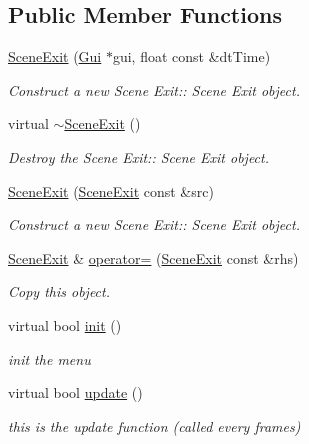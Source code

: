\subsection*{Public Member Functions}
\begin{DoxyCompactItemize}
\item 
\hyperlink{class_scene_exit_ac7fd49d030cc70f80bcedd66017f461f}{Scene\+Exit} (\hyperlink{class_gui}{Gui} $\ast$gui, float const \&dt\+Time)
\begin{DoxyCompactList}\small\item\em Construct a new Scene Exit\+:\+: Scene Exit object. \end{DoxyCompactList}\item 
\mbox{\label{class_scene_exit_aa27eccb4dabd1b578c260dd92873e437}} 
virtual \hyperlink{class_scene_exit_aa27eccb4dabd1b578c260dd92873e437}{$\sim$\+Scene\+Exit} ()
\begin{DoxyCompactList}\small\item\em Destroy the Scene Exit\+:\+: Scene Exit object. \end{DoxyCompactList}\item 
\hyperlink{class_scene_exit_a12008540e3edf0c1cd49140d5189f918}{Scene\+Exit} (\hyperlink{class_scene_exit}{Scene\+Exit} const \&src)
\begin{DoxyCompactList}\small\item\em Construct a new Scene Exit\+:\+: Scene Exit object. \end{DoxyCompactList}\item 
\hyperlink{class_scene_exit}{Scene\+Exit} \& \hyperlink{class_scene_exit_a5675f92fcd0cd2ca21a310e2a55a8309}{operator=} (\hyperlink{class_scene_exit}{Scene\+Exit} const \&rhs)
\begin{DoxyCompactList}\small\item\em Copy this object. \end{DoxyCompactList}\item 
virtual bool \hyperlink{class_scene_exit_ad9168291bb031fee797a7964590e1b73}{init} ()
\begin{DoxyCompactList}\small\item\em init the menu \end{DoxyCompactList}\item 
virtual bool \hyperlink{class_scene_exit_a60fd49ea48551bd3035efa7cabe4d08d}{update} ()
\begin{DoxyCompactList}\small\item\em this is the update function (called every frames) \end{DoxyCompactList}\item 

\end{DoxyCompactItemize}
